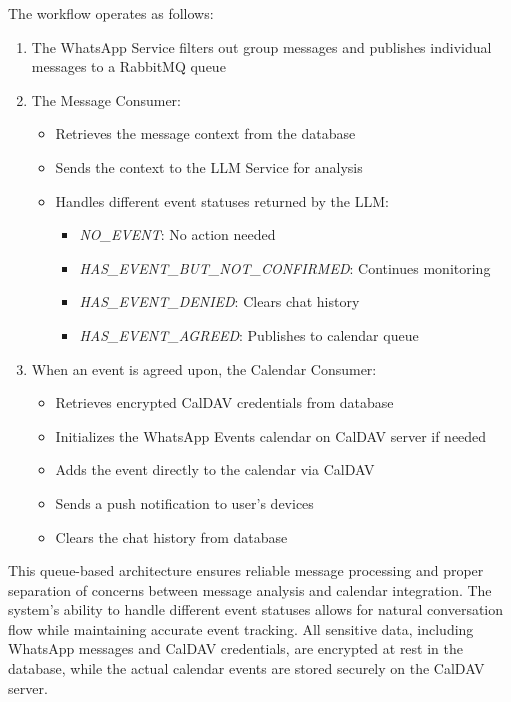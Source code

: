 The workflow operates as follows:
\begin{enumerate}
  \item The WhatsApp Service filters out group messages and publishes individual messages to a RabbitMQ queue
  \item The Message Consumer:
        \begin{itemize}
          \item Retrieves the message context from the database
          \item Sends the context to the LLM Service for analysis
          \item Handles different event statuses returned by the LLM:
                \begin{itemize}
                  \item \textit{NO\_EVENT}: No action needed
                  \item \textit{HAS\_EVENT\_BUT\_NOT\_CONFIRMED}: Continues monitoring
                  \item \textit{HAS\_EVENT\_DENIED}: Clears chat history
                  \item \textit{HAS\_EVENT\_AGREED}: Publishes to calendar queue
                \end{itemize}
        \end{itemize}
  \item When an event is agreed upon, the Calendar Consumer:
        \begin{itemize}
          \item Retrieves encrypted CalDAV credentials from database
          \item Initializes the WhatsApp Events calendar on CalDAV server if needed
          \item Adds the event directly to the calendar via CalDAV
          \item Sends a push notification to user's devices
          \item Clears the chat history from database
        \end{itemize}
\end{enumerate}

This queue-based architecture ensures reliable message processing and proper separation of concerns between message analysis and calendar integration. The system's ability to handle different event statuses allows for natural conversation flow while maintaining accurate event tracking. All sensitive data, including WhatsApp messages and CalDAV credentials, are encrypted at rest in the database, while the actual calendar events are stored securely on the CalDAV server.

